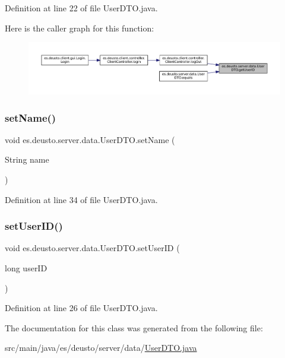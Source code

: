 Definition at line 22 of file User\+D\+T\+O.\+java.

Here is the caller graph for this function\+:
\nopagebreak
\begin{figure}[H]
\begin{center}
\leavevmode
\includegraphics[width=350pt]{classes_1_1deusto_1_1server_1_1data_1_1_user_d_t_o_ae04b78d874974f7f3307b68fa2a15210_icgraph}
\end{center}
\end{figure}
\mbox{\label{classes_1_1deusto_1_1server_1_1data_1_1_user_d_t_o_a15f7773676e2cca068e63f604fb61ab0}} 
\subsubsection{\texorpdfstring{setName()}{setName()}}
{\footnotesize\ttfamily void es.\+deusto.\+server.\+data.\+User\+D\+T\+O.\+set\+Name (\begin{DoxyParamCaption}\item[{String}]{name }\end{DoxyParamCaption})}



Definition at line 34 of file User\+D\+T\+O.\+java.

\mbox{\label{classes_1_1deusto_1_1server_1_1data_1_1_user_d_t_o_ad96e17b7c2a478f263f7a7b8bf7dde14}} 
\subsubsection{\texorpdfstring{setUserID()}{setUserID()}}
{\footnotesize\ttfamily void es.\+deusto.\+server.\+data.\+User\+D\+T\+O.\+set\+User\+ID (\begin{DoxyParamCaption}\item[{long}]{user\+ID }\end{DoxyParamCaption})}



Definition at line 26 of file User\+D\+T\+O.\+java.



The documentation for this class was generated from the following file\+:\begin{DoxyCompactItemize}
\item 
src/main/java/es/deusto/server/data/\mbox{\hyperlink{_user_d_t_o_8java}{User\+D\+T\+O.\+java}}\end{DoxyCompactItemize}
